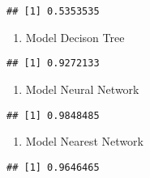 \documentclass[]{article}
\newenvironment{Shaded}{\begin{snugshade}}{\end{snugshade}}
\newcommand{\KeywordTok}[1]{\textcolor[rgb]{0.13,0.29,0.53}{\textbf{#1}}}
\newcommand{\NormalTok}[1]{#1}
\newcommand{\OperatorTok}[1]{\textcolor[rgb]{0.81,0.36,0.00}{\textbf{#1}}}
\providecommand{\tightlist}{%
  \setlength{\itemsep}{0pt}\setlength{\parskip}{0pt}}
\begin{document}
\begin{verbatim}
## [1] 0.5353535
\end{verbatim}

\begin{enumerate}
\def\labelenumi{\arabic{enumi}.}
\setcounter{enumi}{1}
\tightlist
\item
  Model Decison Tree
\end{enumerate}

\begin{Shaded}
\end{Shaded}

\begin{verbatim}
## [1] 0.9272133
\end{verbatim}

\begin{enumerate}
\def\labelenumi{\arabic{enumi}.}
\setcounter{enumi}{2}
\tightlist
\item
  Model Neural Network
\end{enumerate}

\begin{Shaded}
\end{Shaded}

\begin{verbatim}
## [1] 0.9848485
\end{verbatim}

\begin{enumerate}
\def\labelenumi{\arabic{enumi}.}
\setcounter{enumi}{3}
\tightlist
\item
  Model Nearest Network
\end{enumerate}

\begin{Shaded}
\end{Shaded}

\begin{verbatim}
## [1] 0.9646465
\end{verbatim}
\end{document}
